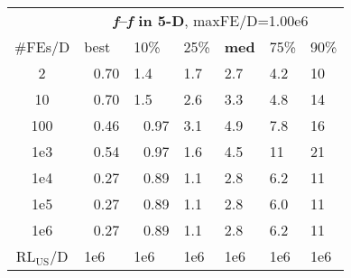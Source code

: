 \begin{tabular}{c|llllll}
 & \multicolumn{6}{|c}{\textbf{\textit{f}\raisebox{-0.35ex}{1}--\textit{f}\raisebox{-0.35ex}{24} in 5-D}, maxFE/D=1.00e6}\\
\#FEs/D & best & 10\% & 25\% & \textbf{med} & 75\% & 90\%\\
2 & ~\,0.70 & \hspace*{1ex}1.4 & \hspace*{1ex}1.7 & \hspace*{1ex}2.7 & \hspace*{1ex}4.2 & 10\\
10 & ~\,0.70 & \hspace*{1ex}1.5 & \hspace*{1ex}2.6 & \hspace*{1ex}3.3 & \hspace*{1ex}4.8 & 14\\
100 & ~\,0.46 & ~\,0.97 & \hspace*{1ex}3.1 & \hspace*{1ex}4.9 & \hspace*{1ex}7.8 & 16\\
1e3 & ~\,0.54 & ~\,0.97 & \hspace*{1ex}1.6 & \hspace*{1ex}4.5 & 11 & 21\\
1e4 & ~\,0.27 & ~\,0.89 & \hspace*{1ex}1.1 & \hspace*{1ex}2.8 & \hspace*{1ex}6.2 & 11\\
1e5 & ~\,0.27 & ~\,0.89 & \hspace*{1ex}1.1 & \hspace*{1ex}2.8 & \hspace*{1ex}6.0 & 11\\
1e6 & ~\,0.27 & ~\,0.89 & \hspace*{1ex}1.1 & \hspace*{1ex}2.8 & \hspace*{1ex}6.2 & 11\\
$\text{RL}_{\text{US}}$/D & 1e6 & 1e6 & 1e6 & 1e6 & 1e6 & 1e6
\end{tabular}
